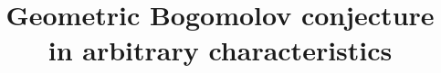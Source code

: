 \documentclass[12pt]{amsart}
\begin{document}
\renewcommand{\iff}{\mbox{ $\Longleftrightarrow$ }}
\newcommand{\supp}{{\rm supp}\,}
\newcommand{\ext}[1]{\stackrel{#1}{\wedge}}
\newcommand{\onto}{\mbox{$\,\>>>\hspace{-.5cm}\to\hspace{.15cm}$}}
\newcommand{\propsubset}
{\mbox{$\textstyle{
\subseteq_{\kern-5pt\raise-1pt\hbox{\mbox{\tiny{$/$}}}}}$}}
\newcommand{\sA}{{\mathcal A}}
\newcommand{\sB}{{\mathcal B}}
\newcommand{\sC}{{\mathcal C}}
\newcommand{\sD}{{\mathcal D}}
\newcommand{\sE}{{\mathcal E}}
\newcommand{\sF}{{\mathcal F}}
\newcommand{\sG}{{\mathcal G}}
\newcommand{\sH}{{\mathcal H}}
\newcommand{\sI}{{\mathcal I}}
\newcommand{\sJ}{{\mathcal J}}
\newcommand{\sK}{{\mathcal K}}
\newcommand{\sL}{{\mathcal L}}
\newcommand{\sM}{{\mathcal M}}
\newcommand{\sN}{{\mathcal N}}
\newcommand{\sO}{{\mathcal O}}
\newcommand{\sP}{{\mathcal P}}
\newcommand{\sQ}{{\mathcal Q}}
\newcommand{\sR}{{\mathcal R}}
\newcommand{\sS}{{\mathcal S}}
\newcommand{\sT}{{\mathcal T}}
\newcommand{\sU}{{\mathcal U}}
\newcommand{\sV}{{\mathcal V}}
\newcommand{\sW}{{\mathcal W}}
\newcommand{\sX}{{\mathcal X}}
\newcommand{\sY}{{\mathcal Y}}
\newcommand{\sZ}{{\mathcal Z}}
\newcommand{\A}{{\mathbb A}}
\newcommand{\B}{{\mathbb B}}
\newcommand{\C}{{\mathbb C}}
\newcommand{\D}{{\mathbb D}}
\newcommand{\E}{{\mathbb E}}
\newcommand{\F}{{\mathbb F}}
\newcommand{\G}{{\mathbb G}}
\newcommand{\HH}{{\mathbb H}}
\newcommand{\I}{{\mathbb I}}
\newcommand{\J}{{\mathbb J}}
\newcommand{\M}{{\mathbb M}}
\newcommand{\N}{{\mathbb N}}
\renewcommand{\P}{{\mathbb P}}
\newcommand{\Q}{{\mathbb Q}}
\newcommand{\R}{{\mathbb R}}
\newcommand{\T}{{\mathbb T}}
\newcommand{\U}{{\mathbb U}}
\newcommand{\V}{{\mathbb V}}
\newcommand{\W}{{\mathbb W}}
\newcommand{\X}{{\mathbb X}}
\newcommand{\Y}{{\mathbb Y}}
\newcommand{\Z}{{\mathbb Z}}
\newcommand{\bk}{{\mathbf{k}}}
\newcommand{\bbk}{{\overline{\mathbf{k}}}}
\newcommand{\Fix}{\mathrm{Fix}}

\newcommand{\tor}{{\mathrm{tor}}}
\renewcommand{\div}{{\mathrm{div}}}

\newcommand{\trdeg}{{\mathrm{trdeg}}}
\newcommand{\Stab}{{\mathrm{Stab}}}

\newcommand{\OK}{{\overline{K}}}
\newcommand{\ok}{{\overline{k}}}


\title[]{Geometric Bogomolov conjecture in arbitrary characteristics}
\end{document}
